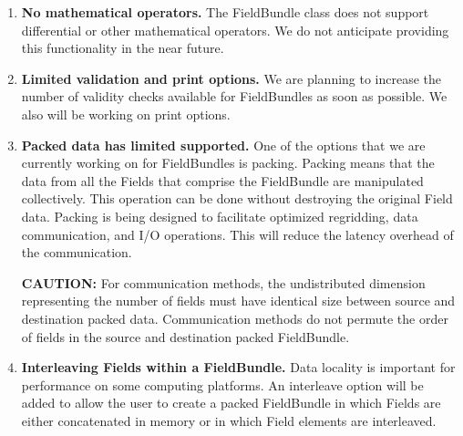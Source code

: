 
\label{sec:bundlerest}

\begin{enumerate}
\item{\bf No mathematical operators.}
The FieldBundle class does not support differential or other
mathematical operators.  We do not anticipate providing this 
functionality in the near future.

\item{\bf Limited validation and print options.}
We are planning to increase the number of validity checks available
for FieldBundles as soon as possible.  We also will
be working on print options.

\item{\bf Packed data has limited supported.}
One of the options that we are currently working on for FieldBundles is
packing.  Packing means that the data from all the
Fields that comprise the FieldBundle are manipulated collectively.
This operation can be done without 
destroying the original Field data.  Packing is being designed to 
facilitate optimized regridding, data communication, and I/O operations.
This will reduce the latency overhead of the communication.  

{\bf CAUTION:} For communication methods, the undistributed dimension representing
the number of fields must have identical size between source and destination packed
data. Communication methods do not permute the order of fields in the source
and destination packed FieldBundle.

\item{\bf Interleaving Fields within a FieldBundle.}
Data locality is important for performance on some computing
platforms.  An interleave option will be added to allow the user to create
a packed FieldBundle in which Fields are either concatenated in memory
or in which Field elements are interleaved.

\end{enumerate}




